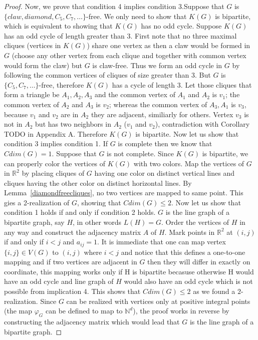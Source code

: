 \documentclass[12pt,a4paper,titlepage,openany]{report}
\begin{document}
\begin{proof}
Now, we prove that condition 4 implies condition 3.\medskip \newline Suppose that $G$ is $\{claw, diamond, C_5, C_7, \ldots \}$-free. We only need to show that $K(G)$ is bipartite, which is equivalent to showing that $K(G)$ has no odd cycle. Suppose $K(G)$ has an odd cycle of length greater than $3$. First note that no three  maximal cliques (vertices in $K(G)$) share one vertex as then a claw would be formed in $G$ (choose any other vertex from each clique and together with common vertex would form the claw) but $G$ is claw-free. Thus we form an odd cycle in $G$ by following the common vertices of cliques of size greater than $3$. But $G$ is $\{C_5,C_7,\ldots\}$-free, therefore $K(G)$ has a cycle of length $3$. Let those cliques that form a triangle be $A_1,A_2,A_3$ and the common vertex of $A_1$ and $A_2$ is $v_1$; the common vertex of $A_2$ and $A_3$ is $v_2$; whereas the common vertex of $A_3,A_1$ is $v_3$, because $v_1$ and $v_2$ are in $A_2$ they are adjacent, similiarly for others. Vertex $v_3$ is not in $A_2$ but has two neighbors in $A_2$ ($v_1$ and $v_2$), contradiction with Corollary TODO in Appendix A. Therefore $K(G)$ is bipartite.\newline \medskip 
Now let us show that condition 3 implies condition 1. If $G$ is complete then we know that $Cdim(G)=1$. Suppose that $G$ is not complete. Since $K(G)$ is bipartite, we can properly color the vertices of $K(G)$ with two colors. Map the vertices of $G$ in $\mathbb{R}^2$ by placing cliques of $G$ having one color on distinct vertical lines and cliques having the other color on distinct horizontal lines. By Lemma~\ref{diamondfreecliques}, no two vertices are mapped to same point. This gies a 2-realization of $G$, showing that $Cdim(G)\leq 2$.
\newline
Now let us show that condition 1 holds if and only if condition 2 holds. $G$ is the line graph of a bipartite graph, say $H$, in other words $L(H)=G$. Order the vertices of $H$ in any way and construct the adjacency matrix $A$ of $H$. Mark points in $\mathbb{R}^2$ at $(i, j)$ if and only if $i<j$ and $a_{ij} = 1$. It is immediate that one can map vertex $\{i,j\}\in V(G)$ to $(i,j)$ where $i<j$ and notice that this defines a one-to-one mapping and if two vertices are adjacent in $G$ then they will differ in exactly on coordinate, this mapping works only if H is bipartite becasuse otherwise H would have an odd cycle and line graph of $H$ would also have an odd cycle which is not possible from implication 4. This shows that $Cdim(G)\leq 2$ as we found a $2$-realization.\newline
Since $G$ can be realized with vertices only at positive integral points (the map $\varphi_G$ can be defined to map to $\mathbb{N}^d$), the proof works in reverse by constructing the adjacency matrix which would lead that $G$ is the line graph of a bipartite graph.
\end{proof}
\end{document}
